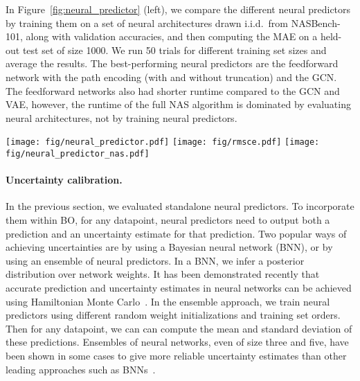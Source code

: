 \documentclass[11pt]{article}
\numberwithin{equation}{section}
\numberwithin{figure}{section}
\theoremstyle{plain}
\theoremstyle{definition}
\begin{document}
In Figure~\ref{fig:neural_predictor} (left), we compare the different neural
predictors by training them on a set of neural architectures drawn i.i.d.\ from
NASBench-101, along with validation accuracies, and then computing the 
MAE on a held-out test set of size 1000. 
We run 50 trials for different training set sizes
and average the results.
The best-performing neural predictors are the feedforward network with the path encoding
(with and without truncation) and the GCN.
The feedforward networks also had shorter runtime compared to the GCN and VAE,
however, the runtime of the full NAS algorithm is dominated by evaluating neural architectures,
not by training neural predictors.


\begin{figure*}[ht]
\centering
\texttt{[image: fig/neural\_predictor.pdf]}
\texttt{[image: fig/rmsce.pdf]}
\texttt{[image: fig/neural\_predictor\_nas.pdf]}
\caption{Performance of neural predictors on NASBench-101:
predictive ability (left), accuracy of uncertainty estimates (middle),
performance in NAS when combined with BO (right). 
}
\label{fig:neural_predictor}
\end{figure*}




\paragraph{Uncertainty calibration.}
In the previous section, we evaluated standalone neural predictors. 
To incorporate them within BO, for any datapoint, neural predictors need to output 
both a prediction and an uncertainty estimate for that prediction.
Two popular ways of achieving uncertainties are by using a Bayesian neural
network (BNN), or by using an ensemble of neural predictors.
In a BNN, we infer a posterior distribution over network weights.
It has been demonstrated recently that accurate prediction and uncertainty 
estimates in neural networks can be achieved using Hamiltonian 
Monte Carlo~\cite{springenberg2016bayesian}.
In the ensemble approach, we train  neural predictors 
using different random weight initializations and training set orders.
Then for any datapoint, we can can compute the mean and standard
deviation of these  predictions.
Ensembles of neural networks, even of size three and five,
have been shown in some cases to give more reliable uncertainty 
estimates than other leading approaches such as BNNs~\cite{lakshminarayanan2017simple, beluch2018power, choi2016ensemble, snoek2019can, zaidi2020neural}.
\end{document}
